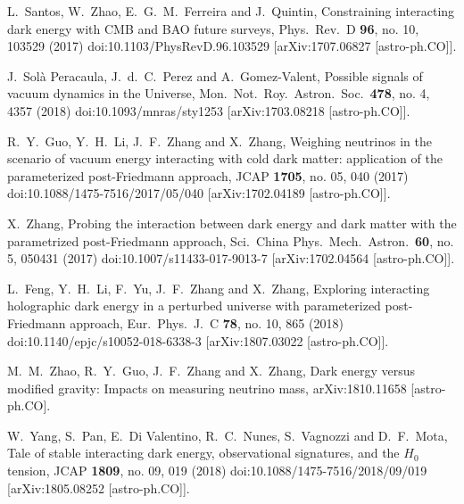 \documentclass[aps,prd,nofootinbib,amsmath,amssymb,superscriptaddress,twocolumn,10pt]{revtex4}%
\begin{document}
\begin{thebibliography}{99}
  L.~Santos, W.~Zhao, E.~G.~M.~Ferreira and J.~Quintin,
  Constraining interacting dark energy with CMB and BAO future surveys,
  Phys.\ Rev.\ D {\bf 96}, no. 10, 103529 (2017)
  doi:10.1103/PhysRevD.96.103529
  [arXiv:1707.06827 [astro-ph.CO]].

  J.~Solà Peracaula, J.~d.~C.~Perez and A.~Gomez-Valent,
  Possible signals of vacuum dynamics in the Universe,
  Mon.\ Not.\ Roy.\ Astron.\ Soc.\  {\bf 478}, no. 4, 4357 (2018)
  doi:10.1093/mnras/sty1253
  [arXiv:1703.08218 [astro-ph.CO]].

  R.~Y.~Guo, Y.~H.~Li, J.~F.~Zhang and X.~Zhang,
  Weighing neutrinos in the scenario of vacuum energy interacting with cold dark matter: application of the parameterized post-Friedmann approach,
  JCAP {\bf 1705}, no. 05, 040 (2017)
  doi:10.1088/1475-7516/2017/05/040
  [arXiv:1702.04189 [astro-ph.CO]].

  X.~Zhang,
  Probing the interaction between dark energy and dark matter with the parametrized post-Friedmann approach,
  Sci.\ China Phys.\ Mech.\ Astron.\  {\bf 60}, no. 5, 050431 (2017)
  doi:10.1007/s11433-017-9013-7
  [arXiv:1702.04564 [astro-ph.CO]].

  L.~Feng, Y.~H.~Li, F.~Yu, J.~F.~Zhang and X.~Zhang,
  Exploring interacting holographic dark energy in a perturbed universe with parameterized post-Friedmann approach,
  Eur.\ Phys.\ J.\ C {\bf 78}, no. 10, 865 (2018)
  doi:10.1140/epjc/s10052-018-6338-3
  [arXiv:1807.03022 [astro-ph.CO]].


  M.~M.~Zhao, R.~Y.~Guo, J.~F.~Zhang and X.~Zhang,
  Dark energy versus modified gravity: Impacts on measuring neutrino mass,
  arXiv:1810.11658 [astro-ph.CO].



  W.~Yang, S.~Pan, E.~Di Valentino, R.~C.~Nunes, S.~Vagnozzi and D.~F.~Mota,
  Tale of stable interacting dark energy, observational signatures, and the $H_0$ tension,
  JCAP {\bf 1809}, no. 09, 019 (2018)
  doi:10.1088/1475-7516/2018/09/019
  [arXiv:1805.08252 [astro-ph.CO]].


\end{thebibliography}
\end{document}
